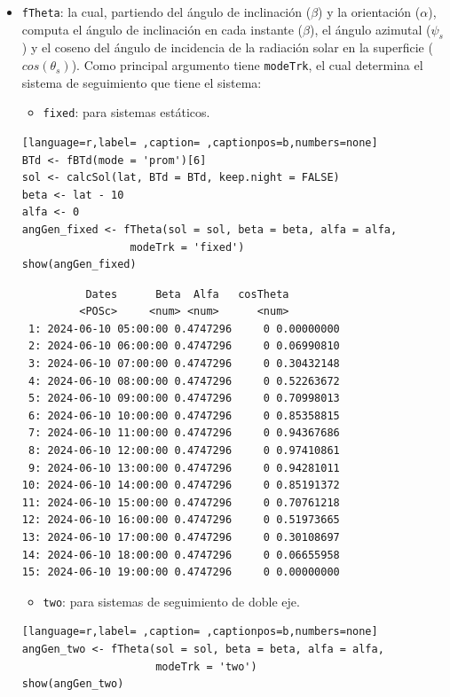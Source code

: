 \begin{itemize}
\item \texttt{fTheta}: la cual, partiendo del ángulo de inclinación (\(\beta\)) y la orientación (\(\alpha\)), computa el ángulo de inclinación en cada instante (\(\beta\)), el ángulo azimutal (\(\psi_s\)) y el coseno del ángulo de incidencia  de la radiación solar en la superficie (\(cos(\theta_s)\)).
Como principal argumento tiene \texttt{modeTrk}, el cual determina el sistema de seguimiento que tiene el sistema:
\begin{itemize}
\item \texttt{fixed}: para sistemas estáticos.
\end{itemize}
\begin{lstlisting}[language=r,label= ,caption= ,captionpos=b,numbers=none]
BTd <- fBTd(mode = 'prom')[6] 
sol <- calcSol(lat, BTd = BTd, keep.night = FALSE)
beta <- lat - 10
alfa <- 0
angGen_fixed <- fTheta(sol = sol, beta = beta, alfa = alfa,
                 modeTrk = 'fixed')
show(angGen_fixed)
\end{lstlisting}

\begin{verbatim}
		  Dates      Beta  Alfa   cosTheta
		 <POSc>     <num> <num>      <num>
 1: 2024-06-10 05:00:00 0.4747296     0 0.00000000
 2: 2024-06-10 06:00:00 0.4747296     0 0.06990810
 3: 2024-06-10 07:00:00 0.4747296     0 0.30432148
 4: 2024-06-10 08:00:00 0.4747296     0 0.52263672
 5: 2024-06-10 09:00:00 0.4747296     0 0.70998013
 6: 2024-06-10 10:00:00 0.4747296     0 0.85358815
 7: 2024-06-10 11:00:00 0.4747296     0 0.94367686
 8: 2024-06-10 12:00:00 0.4747296     0 0.97410861
 9: 2024-06-10 13:00:00 0.4747296     0 0.94281011
10: 2024-06-10 14:00:00 0.4747296     0 0.85191372
11: 2024-06-10 15:00:00 0.4747296     0 0.70761218
12: 2024-06-10 16:00:00 0.4747296     0 0.51973665
13: 2024-06-10 17:00:00 0.4747296     0 0.30108697
14: 2024-06-10 18:00:00 0.4747296     0 0.06655958
15: 2024-06-10 19:00:00 0.4747296     0 0.00000000
\end{verbatim}

\begin{itemize}
\item \texttt{two}: para sistemas de seguimiento de doble eje.
\end{itemize}
\begin{lstlisting}[language=r,label= ,caption= ,captionpos=b,numbers=none]
angGen_two <- fTheta(sol = sol, beta = beta, alfa = alfa,
                     modeTrk = 'two')
show(angGen_two)
\end{lstlisting}


\end{itemize}
